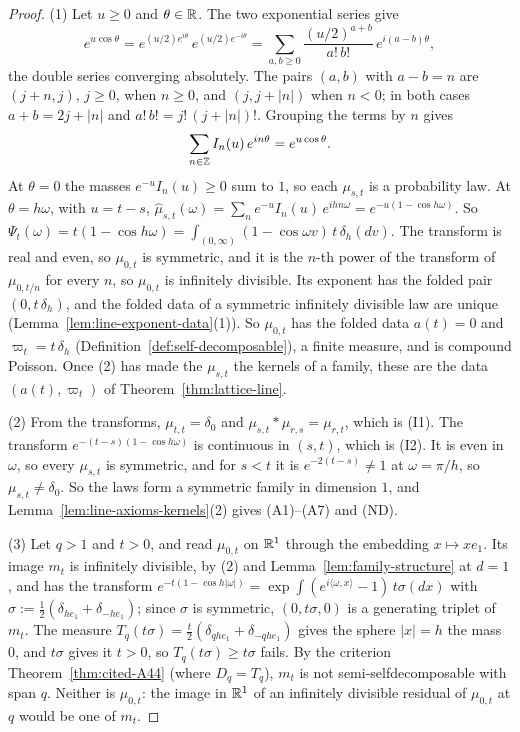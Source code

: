 \begin{proof}
(1) Let $u \ge 0$ and $\theta \in \mathbb{R}$. The two exponential series give
\[
  e^{u\cos\theta} = e^{(u/2)e^{i\theta}}\,e^{(u/2)e^{-i\theta}}
  = \sum_{a, b \ge 0}\frac{(u/2)^{a+b}}{a!\,b!}\,e^{i(a-b)\theta} ,
\]
the double series converging absolutely. The pairs $(a, b)$ with $a - b = n$ are
$(j + n, j)$, $j \ge 0$, when $n \ge 0$, and $(j, j + |n|)$ when $n < 0$; in both cases
$a + b = 2j + |n|$ and $a!\,b! = j!\,(j + |n|)!$. Grouping the terms by $n$ gives
\[
  \sum_{n \in \mathbb{Z}}I_n(u)\,e^{in\theta} = e^{u\cos\theta} .
\]
At $\theta = 0$ the masses $e^{-u}I_n(u) \ge 0$ sum to $1$, so each $\mu_{s,t}$ is a probability
law. At $\theta = h\omega$, with $u = t - s$,
$\widehat\mu_{s,t}(\omega) = \sum_n e^{-u}I_n(u)\,e^{ihn\omega} = e^{-u(1 - \cos h\omega)}$. So
$\Psi_t(\omega) = t(1 - \cos h\omega) = \int_{(0,\infty)}(1 - \cos\omega v)\,t\,\delta_h(dv)$.
The transform is real and even, so $\mu_{0,t}$ is symmetric, and it is the $n$-th power of the
transform of $\mu_{0,t/n}$ for every $n$, so $\mu_{0,t}$ is infinitely divisible. Its exponent has
the folded pair $(0, t\,\delta_h)$, and the folded data of a symmetric infinitely divisible law
are unique (Lemma~\ref{lem:line-exponent-data}(1)). So $\mu_{0,t}$ has the folded data
$a(t) = 0$ and $\varpi_t = t\,\delta_h$ (Definition~\ref{def:self-decomposable}), a
finite measure, and is compound Poisson. Once (2) has made the $\mu_{s,t}$ the kernels of a family,
these are the data $(a(t), \varpi_t)$ of Theorem~\ref{thm:lattice-line}.

(2) From the transforms, $\mu_{t,t} = \delta_0$ and $\mu_{s,t} * \mu_{r,s} = \mu_{r,t}$, which is
(I1). The transform $e^{-(t-s)(1 - \cos h\omega)}$ is continuous in $(s,t)$, which is (I2). It is
even in $\omega$, so every $\mu_{s,t}$ is symmetric, and for $s < t$ it is
$e^{-2(t-s)} \ne 1$ at $\omega = \pi/h$, so $\mu_{s,t} \ne \delta_0$. So the laws form a symmetric
family in dimension $1$, and Lemma~\ref{lem:line-axioms-kernels}(2) gives (A1)--(A7) and (ND).

(3) Let $q > 1$ and $t > 0$, and read $\mu_{0,t}$ on $\mathbb{R}^1$ through the embedding
$x \mapsto xe_1$. Its image $m_t$ is infinitely divisible, by (2) and
Lemma~\ref{lem:family-structure} at $d = 1$, and has the transform
$e^{-t(1 - \cos h|\omega|)} = \exp\int(e^{i\langle\omega, x\rangle} - 1)\,t\sigma(dx)$ with
$\sigma := \tfrac12(\delta_{he_1} + \delta_{-he_1})$; since $\sigma$ is symmetric,
$(0, t\sigma, 0)$ is a generating triplet of $m_t$. The measure
$T_q(t\sigma) = \tfrac{t}{2}(\delta_{qhe_1} + \delta_{-qhe_1})$ gives the sphere $|x| = h$ the mass
$0$, and $t\sigma$ gives it $t > 0$, so $T_q(t\sigma) \ge t\sigma$ fails. By the criterion
Theorem~\ref{thm:cited-A44} (where $D_q = T_q$), $m_t$ is
not semi-selfdecomposable with span $q$. Neither is $\mu_{0,t}$: the image in $\mathbb{R}^1$ of an
infinitely divisible residual of $\mu_{0,t}$ at $q$ would be one of $m_t$.


\end{proof}
